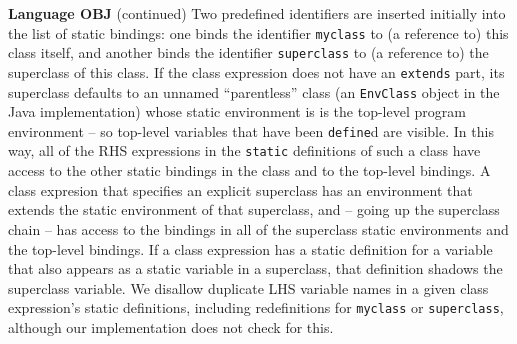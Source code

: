 \begin{minipage}[t]{\sw}
\slidenumber
\LARGE
{\bf Language OBJ} (continued)\exx
Two predefined identifiers are inserted initially into the list
of static bindings:
one binds the identifier \verb'myclass'
to (a reference to) this class itself,
and another binds the identifier \verb'superclass'
to (a reference to) the superclass of this class.\exx
If the class expression does not have an \verb'extends' part, 
its superclass defaults to an unnamed ``parentless'' class
(an \verb'EnvClass' object in the Java implementation)
whose static environment is is the top-level program environment --
so top-level variables that have been \verb'define'd are visible.
In this way, all of the RHS expressions in the \verb'static' definitions
of such a class have access to the other static bindings in the class
and to the top-level bindings.\exx
A class expresion that specifies an explicit superclass
has an environment that extends
the static environment of that superclass,
and -- going up the superclass chain --
has access to the bindings in all
of the superclass static environments
and the top-level bindings.\exx
If a class expression has a static definition for a variable
that also appears as a static variable in a superclass,
that definition shadows the superclass variable.
We disallow duplicate LHS variable names
in a given class expression's static definitions,
including redefinitions for \verb'myclass' or \verb'superclass',
although our implementation does not check for this.
\end{minipage}
